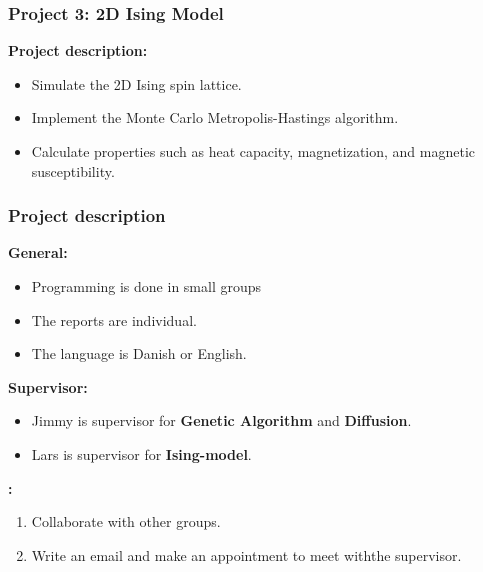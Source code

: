 \documentclass{beamer}
\begin{document}
{\begin{columns}[c]
    \end{columns}

}


\frame
{
    \frametitle{Project 3: 2D Ising Model}

    \textbf{Project description:}

    \bigskip

    \begin{itemize}

        \item Simulate the 2D Ising spin lattice.

        \bigskip

        \item Implement the Monte Carlo Metropolis-Hastings algorithm.

        \bigskip

        \item Calculate properties such as heat capacity, magnetization, and magnetic susceptibility.

    \end{itemize}

}


\frame
{

    \frametitle{Project description}

    \textbf{General:}

    \begin{itemize}

        \item Programming is done in small groups

        \item The reports are individual.

        \item The language is Danish or English.

    \end{itemize}

    \bigskip

    \textbf{Supervisor:}

    \begin{itemize}

        \item Jimmy is supervisor for {\bf Genetic Algorithm} and {\bf Diffusion}.

        \item Lars is supervisor for {\bf Ising-model}.

    \end{itemize}

    \bigskip

    \textbf{:}

    \begin{enumerate}

        \item Collaborate with other groups.

        \item Write an email and make an appointment to meet with\newline the supervisor.

    \end{enumerate}

}


\end{document}
